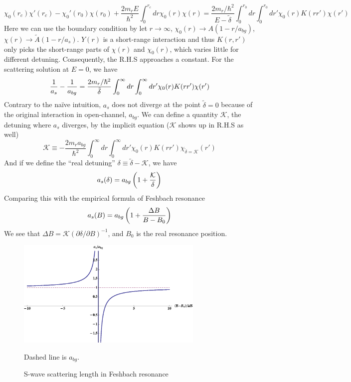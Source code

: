 \begin{equation}
\chi_{0}(r_{c})\chi'(r_{c})-\chi_{0}'(r_{0})\chi(r_{0})+\frac{2m_{r}E}{\hbar^{2}}\int_{0}^{r_{c}}dr\chi_{0}(r)\chi(r)
=\frac{2m_{r}/\hbar^{2}}{E-\tilde\delta}\int_{0}^{r_{0}}dr\int_{0}^{r_{0}}dr'\chi_{0}(r)K(rr')\chi(r')
\end{equation}
Here we can use the boundary condition by let $r\rightarrow\infty$, $\chi_{0}(r)\rightarrow{A}(1-r/a_{bg})$, $\chi(r)\rightarrow\tilde{A}(1-r/a_{s})$.  $Y(r)$ is a short-range interaction and thus $K(r,r')$ only picks the short-range parts of $\chi(r)$ and $\chi_{0}(r)$, which varies little for different detuning. Consequently,  the R.H.S approaches a constant.  For the scattering solution at  $E=0$, we have 
\begin{equation}
\frac{1}{a_{s}}-\frac{1}{a_{bg}}=\frac{2m_{r}/\hbar^{2}}{\tilde\delta}\int_{0}^{\infty}dr\int_{0}^{\infty}dr'\chi_{0}(r)K(rr')\chi(r')
\end{equation}
Contrary to the na\"ive intuition, $a_{s}$ does not diverge at the point $\tilde\delta=0$ because of the original interaction in open-channel, $a_{bg}$.  We can define a quantity $\mathcal{K}$, the detuning where $a_{s}$ diverges, by the implicit equation ($\mathcal{K}$ shows up in R.H.S as well)
\begin{equation}\label{eq:intro:kappa}
\mathcal{K}\equiv-\frac{2m_{r}a_{bg}}{\hbar^{2}}\int_{0}^{\infty}{dr}\int_{0}^{\infty}dr'\chi_{0}(r)K(rr')\chi_{\tilde\delta=\mathcal{K}}(r')
\end{equation}
And if we define the ``real detuning'' $\delta\equiv\tilde\delta-\mathcal{K}$, we have 
\begin{equation}\label{eq:intro:asK}
a_{s}(\delta)=a_{bg}\left(1+\frac{\mathcal{K}}{\delta}\right)
\end{equation}
Comparing this with the empirical formula of Feshbach resonance
\begin{equation}
a_{s}(B)=a_{bg}\left(1+\frac{\Delta{B}}{B-B_{0}}\right)
\end{equation}
We see that $\Delta{B}=\mathcal{K}(\partial\delta/\partial{B})^{-1}$, and $B_{0}$ is the real resonance position.  %
\begin{figure}[htbp]
\begin{center}
\includegraphics[width=0.8\textwidth]{FeshbachAs}
\caption{S-wave scattering length in Feshbach resonance} 
\label{fig:intro:Feshbach}
{\small Dashed line is $a_{bg}$.}
\end{center}
\end{figure}

